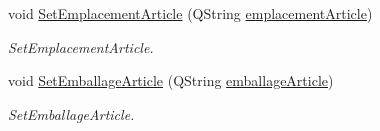 \begin{DoxyCompactItemize}
void \mbox{\hyperlink{class_article_ae543837747d1022bd91afb5ca7e7cc32}{Set\+Emplacement\+Article}} (Q\+String \mbox{\hyperlink{class_article_a97f4fcb1534dbe969fcb2f6f2a8fdbd7}{emplacement\+Article}})
\begin{DoxyCompactList}\small\item\em Set\+Emplacement\+Article. \end{DoxyCompactList}\item 
void \mbox{\hyperlink{class_article_abfde880e0537319807827026d0d7897f}{Set\+Emballage\+Article}} (Q\+String \mbox{\hyperlink{class_article_a9ee6bb591aaba7535eac3d5965467965}{emballage\+Article}})
\begin{DoxyCompactList}\small\item\em Set\+Emballage\+Article. \end{DoxyCompactList}\end{DoxyCompactItemize}
